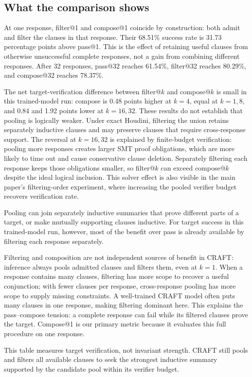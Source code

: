 \documentclass[10pt]{article}
\begin{document}
\subsection{What the comparison shows}

At one response, filter@1 and compose@1 coincide by construction: both
admit and filter the clauses in that response. Their 68.51\% success rate is
31.73 percentage points above pass@1. This is the effect of retaining useful
clauses from otherwise unsuccessful complete responses, not a gain from
combining different responses. After 32 responses, pass@32 reaches 61.54\%,
filter@32 reaches 80.29\%, and compose@32 reaches 78.37\%.

The net target-verification difference between filter@\(k\) and
compose@\(k\) is small in this trained-model run: compose is 0.48 points
higher at \(k=4\), equal at \(k=1,8\), and 0.84 and 1.92 points lower at
\(k=16,32\). These results do not establish that pooling is logically weaker.
Under exact Houdini,
filtering the union retains separately inductive clauses and may preserve
clauses that require cross-response support. The reversal at \(k=16,32\)
is explained by finite-budget verification: pooling more responses creates
larger SMT proof obligations, which are more likely to time out and cause
conservative clause deletion. Separately filtering each response keeps those
obligations smaller, so filter@\(k\) can exceed compose@\(k\) despite the
ideal logical inclusion. This solver effect is also visible in the main
paper's filtering-order experiment, where increasing the pooled verifier
budget recovers verification rate.

Pooling can join separately inductive summaries that prove different parts
of a target, or make mutually supporting clauses inductive. For target
success in this trained-model run, however, most of the benefit over pass
is already available by filtering each response separately.

Filtering and composition are not independent sources of benefit in CRAFT:
inference always pools admitted clauses and filters them, even at \(k=1\).
When a response contains many clauses, filtering has more scope to recover a
useful conjunction; with fewer clauses per response, cross-response pooling
has more scope to supply missing constraints. A well-trained CRAFT model often
puts many clauses in one response, making filtering dominant here. This
explains the pass--compose tension: a complete response can fail while its
filtered clauses prove the target. Compose@1 is our primary metric because it
evaluates this full procedure on one response.

This table measures target verification, not invariant strength. CRAFT still
pools and filters all available clauses to seek the strongest inductive
summary supported by the candidate pool within its verifier budget.
\end{document}
